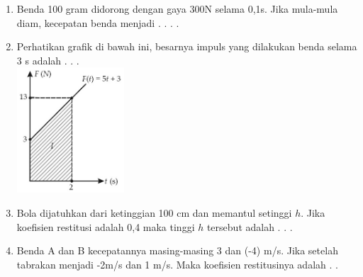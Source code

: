 \documentclass[10pt,a4paper]{extarticle}
\begin{document}
\begin{multicols*}{2}
\begin{enumerate}
\item Benda 100 gram didorong dengan gaya 300N selama 0,1s. Jika mula-mula diam, kecepatan benda menjadi . . . .
\vspace{3cm}


\item Perhatikan grafik di bawah ini, besarnya impuls yang dilakukan benda selama 3 s adalah . . . \\
\includegraphics[width=4cm]{pic/latul-mom3} 
\vspace{2cm}

\item Bola dijatuhkan dari ketinggian 100 cm dan memantul setinggi $h$. Jika koefisien restitusi adalah 0,4 maka tinggi $h$ tersebut adalah . . .
\vspace{2cm}

\item Benda A dan B kecepatannya masing-masing 3 dan (-4) m/s. Jika setelah tabrakan menjadi -2m/s dan 1 m/s. Maka koefisien restitusinya adalah . . 
\end{enumerate}
\end{multicols*}
\end{document}
